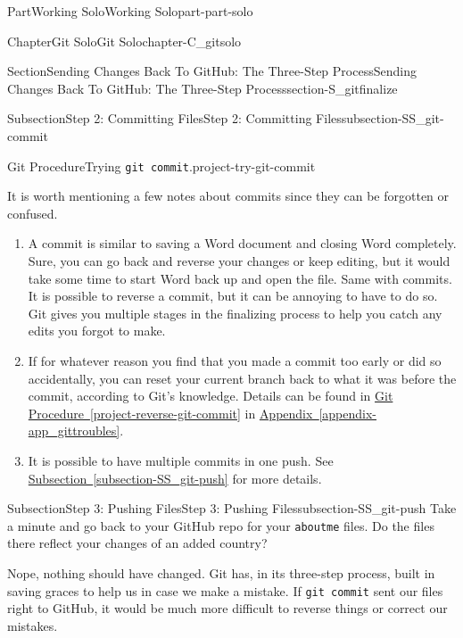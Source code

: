 \documentclass[oneside,10pt,]{book}
\newcommand{\xreffont}{\relax}
\newcommand{\mono}[1]{\texttt{#1}}
\begin{document}
\begin{partptx}{Part}{Working Solo}{}{Working Solo}{}{}{part-part-solo}
\begin{chapterptx}{Chapter}{Git Solo}{}{Git Solo}{}{}{chapter-C_gitsolo}
\begin{sectionptx}{Section}{Sending Changes Back To GitHub: The Three-Step Process}{}{Sending Changes Back To GitHub: The Three-Step Process}{}{}{section-S_gitfinalize}
\begin{subsectionptx}{Subsection}{Step 2: Committing Files}{}{Step 2: Committing Files}{}{}{subsection-SS_git-commit}
\begin{project}{Git Procedure}{Trying \mono{git commit}.}{project-try-git-commit}
\begin{enumerate}[font=\bfseries,label=(\alph*),ref=\alph*]
\end{enumerate}%
\end{project}%
 It is worth mentioning a few notes about commits since they can be forgotten or confused.%
\begin{enumerate}
\item{}A commit is similar to saving a Word document and closing Word completely. Sure, you can go back and reverse your changes or keep editing, but it would take some time to start Word back up and open the file. Same with commits. It is possible to reverse a commit, but it can be annoying to have to do so. Git gives you multiple stages in the finalizing process to help you catch any edits you forgot to make.%
\item{}If for whatever reason you find that you made a commit too early or did so accidentally, you can reset your current branch back to what it was before the commit, according to Git's knowledge. Details can be found in \hyperref[project-reverse-git-commit]{Git Procedure~{\xreffont\ref{project-reverse-git-commit}}} in \hyperref[appendix-app_gittroubles]{Appendix~{\xreffont\ref{appendix-app_gittroubles}}}.%
\item{}It is possible to have multiple commits in one push. See \hyperref[subsection-SS_git-push]{Subsection~{\xreffont\ref{subsection-SS_git-push}}} for more details.%
\end{enumerate}
%
\end{subsectionptx}
%
%
\typeout{************************************************}
\typeout{************************************************}
%
\begin{subsectionptx}{Subsection}{Step 3: Pushing Files}{}{Step 3: Pushing Files}{}{}{subsection-SS_git-push}
%
%
%
%
%
%
Take a minute and go back to your GitHub repo for your \mono{aboutme} files. Do the files there reflect your changes of an added country?%
\par
Nope, nothing should have changed. Git has, in its three-step process, built in saving graces to help us in case we make a mistake. If \mono{git commit} sent our files right to GitHub, it would be much more difficult to reverse things or correct our mistakes.%
\par

\end{subsectionptx}
\end{sectionptx}
\end{chapterptx}
\end{partptx}
\end{document}
